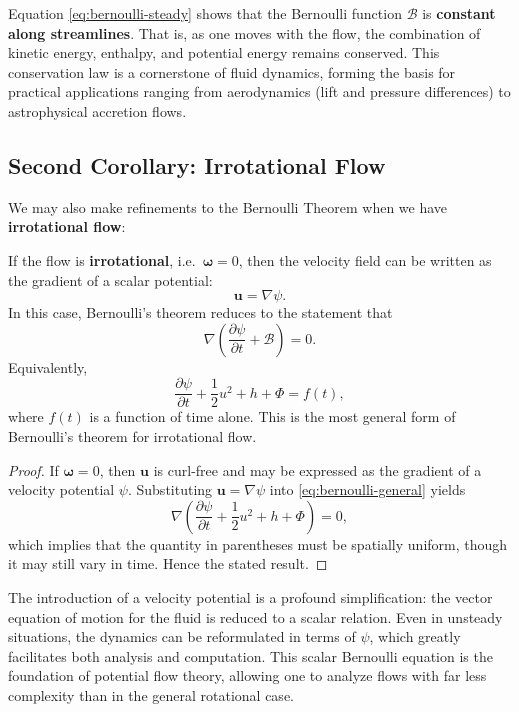 Equation \eqref{eq:bernoulli-steady} shows that the Bernoulli function $\mathcal{B}$ is \textbf{constant along streamlines}. That is, as one moves with the flow, the combination of kinetic energy, enthalpy, and potential energy remains conserved. This conservation law is a cornerstone of fluid dynamics, forming the basis for practical applications ranging from aerodynamics (lift and pressure differences) to astrophysical accretion flows.

\subsection{Second Corollary: Irrotational Flow}

We may also make refinements to the Bernoulli Theorem when we have \textbf{irrotational flow}:
\vspace{0.5cm}
\begin{corollary}
If the flow is \textbf{irrotational}, i.e.\ $\boldsymbol{\omega} = 0$, then the velocity field can be written as the gradient of a scalar potential:
\[
\mathbf{u} = \nabla \psi.
\]
In this case, Bernoulli’s theorem reduces to the statement that
\[
\nabla\left(\frac{\partial \psi}{\partial t} + \mathcal{B}\right) = 0.
\]
Equivalently,
\[
\frac{\partial \psi}{\partial t} + \frac{1}{2}u^2 + h + \Phi = f(t),
\]
where $f(t)$ is a function of time alone. This is the most general form of Bernoulli’s theorem for irrotational flow.
\end{corollary}
\begin{proof}
If $\boldsymbol{\omega} = 0$, then $\mathbf{u}$ is curl-free and may be expressed as the gradient of a velocity potential $\psi$. Substituting $\mathbf{u} = \nabla \psi$ into \eqref{eq:bernoulli-general} yields
\[
\nabla\!\left(\frac{\partial \psi}{\partial t} + \frac{1}{2}u^2 + h + \Phi \right) = 0,
\]
which implies that the quantity in parentheses must be spatially uniform, though it may still vary in time. Hence the stated result.
\end{proof}
\vspace{0.5cm}
The introduction of a velocity potential is a profound simplification: the vector equation of motion for the fluid is reduced to a scalar relation. Even in unsteady situations, the dynamics can be reformulated in terms of $\psi$, which greatly facilitates both analysis and computation. This scalar Bernoulli equation is the foundation of potential flow theory, allowing one to analyze flows with far less complexity than in the general rotational case.


